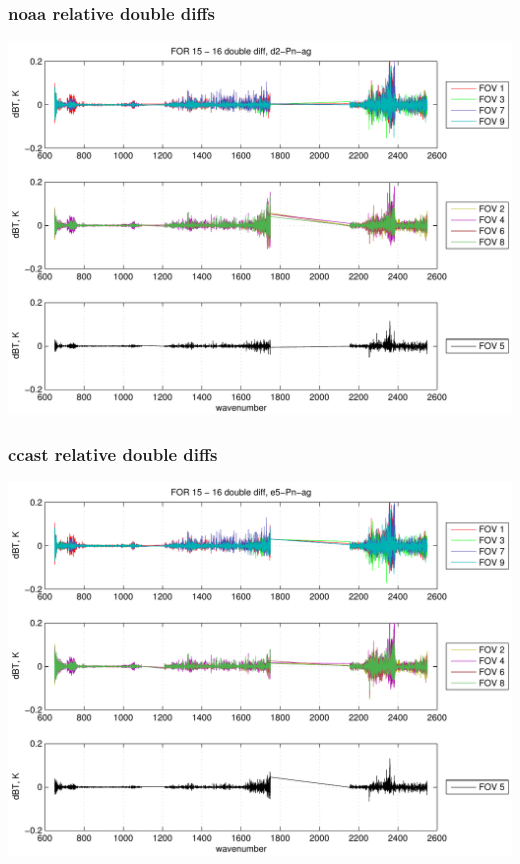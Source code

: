 \documentclass[11pt]{beamer}
\begin{document}
\begin{frame}
\frametitle{noaa relative double diffs}
\begin{center}
  \includegraphics[scale=0.5]{figures/rel_noaa_ddif.pdf}
\end{center}
\end{frame}

\begin{frame}
\frametitle{ccast relative double diffs}
\begin{center}
  \includegraphics[scale=0.5]{figures/rel_ccast_ddif.pdf}
\end{center}
\end{frame}
\end{document}
